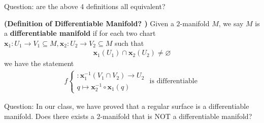\documentclass{report}
\begin{document}
\begin{mdframed}
Question: are the above 4 definitions all equivalent? 
\end{mdframed}
\begin{definition}
\textbf{(Definition of Differentiable Manifold? )} Given a $2$-manifold  $M$, we say  $M$ is a \textbf{differentiable manifold} if for each  two chart $\textbf{x}_1:U_1\rightarrow V_1\subseteq M,\textbf{x}_2:U_2\rightarrow V_2\subseteq M$ such that 
\begin{align*}
\textbf{x}_1(U_1)\cap \textbf{x}_2(U_2)\neq \varnothing
\end{align*}
we have the statement 
\begin{align*}
f\begin{cases}
 :\textbf{x}_1^{-1}(V_1\cap V_2)\rightarrow U_2 \\
 q\mapsto  \textbf{x}_2^{-1}\circ \textbf{x}_1(q)
\end{cases}\text{ is differentiable }
\end{align*}
\end{definition}
\begin{mdframed}
Question: In our class, we have proved that a regular surface is a differentiable manifold. Does there exists a 2-manifold that is NOT a differentiable manifold? 
\end{mdframed}
\end{document}
